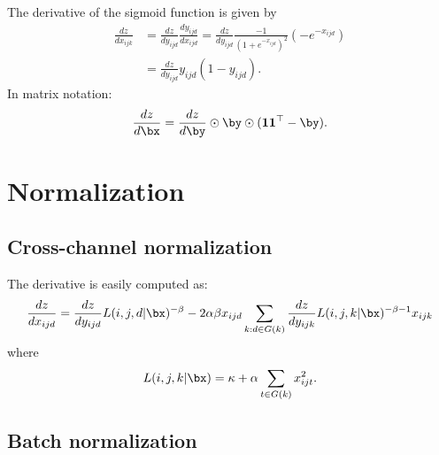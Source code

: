 The derivative of the sigmoid function is given by
\begin{align*}
\frac{dz}{dx_{ijk}}
&= 
\frac{dz}{d y_{ijd}} 
\frac{d y_{ijd}}{d x_{ijd}}
=
\frac{dz}{d y_{ijd}} 
\frac{-1}{(1+e^{-x_{ijd}})^2} ( - e^{-x_{ijd}})
\\
&=
\frac{dz}{d y_{ijd}} 
y_{ijd} (1 - y_{ijd}).
\end{align*}
In matrix notation:
\[
\frac{dz}{d\bx} = \frac{dz}{d\by} \odot 
\by \odot 
(\mathbf{1}\mathbf{1}^\top - \by).
\]

\section{Normalization}\label{s:normalization}

\subsection{Cross-channel normalization}\label{s:impl-ccnormalization}

The derivative is easily computed as:
\[
\frac{dz}{d x_{ijd}}
=
\frac{dz}{d y_{ijd}}
L(i,j,d|\bx)^{-\beta}
-2\alpha\beta x_{ijd}
\sum_{k:d\in G(k)}
\frac{dz}{d y_{ijk}}
L(i,j,k|\bx)^{-\beta-1} x_{ijk} 
\]
where
\[
 L(i,j,k|\bx) = \kappa + \alpha \sum_{t\in G(k)} x_{ijt}^2.
\]

\subsection{Batch normalization}\label{s:impl-bnorm}

